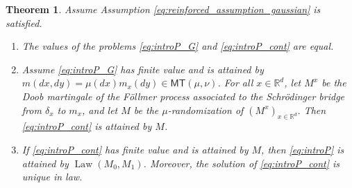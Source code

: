 \documentclass[reqno, a4paper]{amsart}
\theoremstyle{plain}
\newtheorem{theorem}{Theorem}
\theoremstyle{definition}
\theoremstyle{remark}
\numberwithin{equation}{section}
\numberwithin{theorem}{section}
\newcommand{\R}{\mathbb{R}}
\newcommand{\MT}{\mathsf{MT}}
\newcommand{\Law}{\operatorname{Law}}
\begin{document}
	\begin{theorem}
		Assume Assumption \eqref{eq:reinforced_assumption_gaussian} is satisfied.
		\begin{enumerate}
			\item The values of the problems \eqref{eq:introP_G} and \eqref{eq:introP_cont} are equal.
			\item Assume \eqref{eq:introP_G} has finite value and is attained by $m(dx,dy) = \mu(dx)m_x(dy) \in \MT(\mu,\nu)$. For all $x \in \R^d$, let $M^x$ be the Doob martingale of the Föllmer process associated to the Schrödinger bridge from $\delta_x$ to $m_x$, and let $M$ be the $\mu$-randomization of $(M^x)_{x \in \R^d}.$ Then \eqref{eq:introP_cont} is attained by $M$.
			\item If \eqref{eq:introP_cont} has finite value and is attained by $M$, then  \eqref{eq:introP}  is attained by $\Law(M_0,M_1)$. Moreover, the solution of \eqref{eq:introP_cont} is unique in law.
		\end{enumerate}
	\end{theorem}
	
\end{document}
